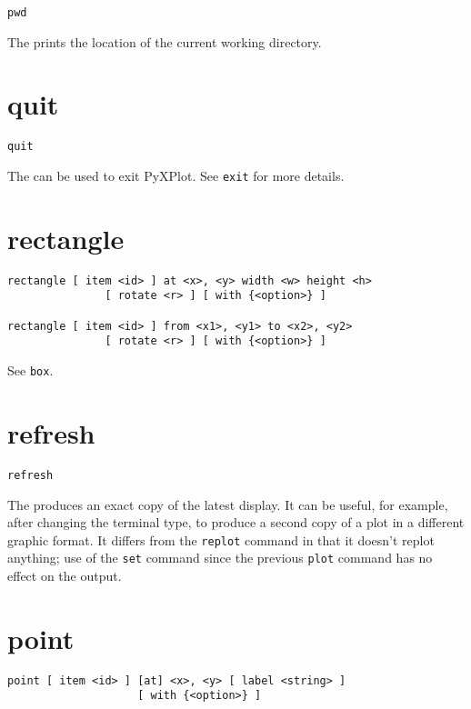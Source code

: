 \begin{verbatim}
pwd
\end{verbatim}

The  prints the location of the current working directory.


\section{quit}

\begin{verbatim}
quit
\end{verbatim}

The  can be used to exit PyXPlot. See {\tt exit} for more
details.


\section{rectangle}

\begin{verbatim}
rectangle [ item <id> ] at <x>, <y> width <w> height <h>
               [ rotate <r> ] [ with {<option>} ]

rectangle [ item <id> ] from <x1>, <y1> to <x2>, <y2>
               [ rotate <r> ] [ with {<option>} ]
\end{verbatim}

See {\tt box}.


\section{refresh}

\begin{verbatim}
refresh
\end{verbatim}

The  produces an exact copy of the latest display. It can be
useful, for example, after changing the terminal type, to produce a second copy
of a plot in a different graphic format. It differs from the {\tt replot}
command in that it doesn't replot anything; use of the {\tt set} command since
the previous {\tt plot} command has no effect on the output.


\section{point}

\begin{verbatim}
point [ item <id> ] [at] <x>, <y> [ label <string> ]
                    [ with {<option>} ]
\end{verbatim}

